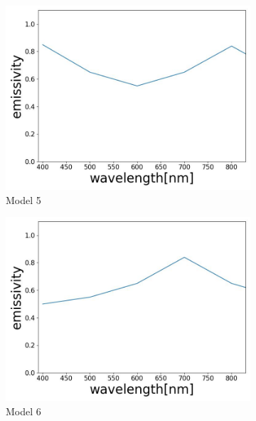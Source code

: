 \begin{figure}[htbp]
    \begin{subfigure}{0.3\linewidth}
      \centering
      \includegraphics[width=\linewidth]{figures/emissivity_25.jpg}
      \caption{Model 5}
      \label{fig: emi_25}
    \end{subfigure}
    \hfill
    \begin{subfigure}{0.3\linewidth}
      \centering
      \includegraphics[width=\linewidth]{figures/emissivity_26.jpg}
      \caption{Model 6}
      \label{fig: emi_26}
    \end{subfigure}
    \hfill
    \begin{subfigure}{0.3\linewidth}
      \centering

\end{subfigure}
\end{figure}
